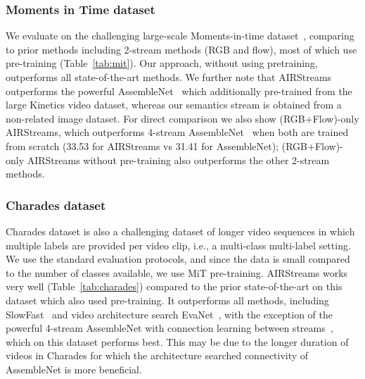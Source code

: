 \documentclass[final]{cvpr}
\begin{document}
\vspace{-0.3cm}
\subsubsection{Moments in Time dataset} We evaluate on the challenging large-scale Moments-in-time dataset~\cite{monfort2018moments}, comparing to prior methods including 2-stream methods (RGB and flow), most of which use pre-training (Table~\ref{tab:mit}).
Our approach, without using pretraining, outperforms all state-of-the-art methods. We further note that AIRStreams outperforms the powerful AssembleNet~\cite{ryoo2020assemblenet} which additionally pre-trained from the large Kinetics video dataset, whereas our semantics stream is obtained from a non-related image dataset. For direct comparison we also show (RGB+Flow)-only AIRStreams, which outperforms 4-stream AssembleNet~\cite{ryoo2020assemblenet} when both are trained from scratch (33.53 for AIRStreams vs 31.41 for AssembleNet); (RGB+Flow)-only AIRStreams without pre-training also outperforms the other 2-stream methods. 

\vspace{-0.3cm}
\subsubsection{Charades dataset}
 Charades dataset is also a challenging dataset of longer video sequences in which multiple labels are provided per video clip, i.e., a multi-class multi-label setting. We use the standard evaluation protocols, and since the data is small compared to the number of classes available, we use MiT pre-training.
AIRStreams works very well (Table~\ref{tab:charades}) compared to the prior state-of-the-art on this dataset which also used pre-training. It outperforms all methods, including SlowFast~\cite{feichtenhofer2018slowfast} and video architecture search EvaNet~\cite{piergiovanni2018evolving}, with the 
exception of the powerful 4-stream AssembleNet with connection learning between streams~\cite{ryoo2020assemblenet}, which on this dataset performs best. This may be due to the longer duration of videos in Charades for which the architecture searched connectivity of AssembleNet is more beneficial. 
\end{document}
